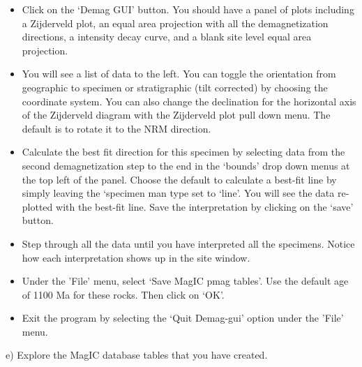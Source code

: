 {\begin{itemize}
\item Click on the 	`Demag GUI' button.  You should have a panel of plots including a  Zijderveld plot, an equal area projection with all the demagnetization directions, a intensity decay curve, and a blank site level equal area projection.    
\item You will see a list of data to the left.   You can toggle the orientation from geographic to specimen or stratigraphic (tilt corrected) by choosing the coordinate system.   You can also change the declination for the horizontal axis of the Zijderveld diagram with the Zijderveld plot pull down menu.  The default is to rotate it to the NRM direction.    
\item  Calculate the best fit direction for this specimen by selecting data from the second demagnetization step to the end in the `bounds' drop down menus at the top left of the panel.   Choose the default to calculate a best-fit line by simply leaving the `specimen man type set to `line'.    You will see the data re-plotted with the best-fit line.   Save the interpretation by clicking on the `save' button.  
\item Step through all the data until you have interpreted all the specimens.   Notice how each interpretation shows up in the site window.  
\item  Under the 'File' menu, select `Save MagIC pmag tables'.  Use the default age of 1100 Ma for these rocks.  Then click on `OK'. 
\item Exit the program by  selecting the `Quit Demag-gui' option under the 'File' menu.  
\end{itemize}


e) Explore the MagIC database tables that you have created. 

}
